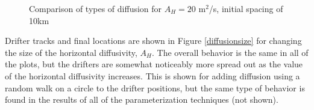 \documentclass[11pt]{article}
\begin{document}
\begin{figure}
    \centering
    \caption{Comparison of types of diffusion for $A_H=20$ m$^2$/s, initial spacing of 10km}
    \label{diffusiontype}
\end{figure}

Drifter tracks and final locations are shown in Figure \ref{diffusionsize} for changing the size of the horizontal diffusivity, $A_H$. The overall behavior is the same in all of the plots, but the drifters are somewhat noticeably more spread out as the value of the horizontal diffusivity increases. This is shown for adding diffusion using a random walk on a circle to the drifter positions, but the same type of behavior is found in the results of all of the parameterization techniques (not shown).
\end{document}

